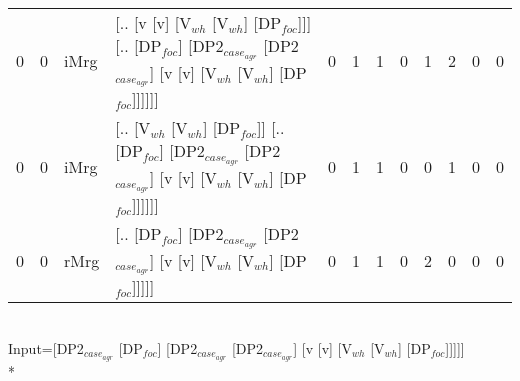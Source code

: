 \begin{tabularx}{\linewidth}{rrlXrrrrrrrr}
   0 &   0 & iMrg & [.. [v [v] [V$_{wh}$ [V$_{wh}$] [DP$_{foc}$]]] [.. [DP$_{foc}$] [DP2$_{case_{agr}}$ [DP2$_{case_{agr}}$] [v [v] [V$_{wh}$ [V$_{wh}$] [DP$_{foc}$]]]]]]                               &            0 &             1 &             1 &                  0 &            1 &             2 &                0 &            0 \\
   0 &   0 & iMrg & [.. [V$_{wh}$ [V$_{wh}$] [DP$_{foc}$]] [.. [DP$_{foc}$] [DP2$_{case_{agr}}$ [DP2$_{case_{agr}}$] [v [v] [V$_{wh}$ [V$_{wh}$] [DP$_{foc}$]]]]]]                                       &            0 &             1 &             1 &                  0 &            0 &             1 &                0 &            0 \\
   0 &   0 & rMrg & [.. [DP$_{foc}$] [DP2$_{case_{agr}}$ [DP2$_{case_{agr}}$] [v [v] [V$_{wh}$ [V$_{wh}$] [DP$_{foc}$]]]]]                                                                   &            0 &             1 &             1 &                  0 &            2 &             0 &                0 &            0 \\
\hline
\end{tabularx}\endgroup\\
\begingroup\scriptsize Input=[DP2$_{case_{agr}}$ [DP$_{foc}$] [DP2$_{case_{agr}}$ [DP2$_{case_{agr}}$] [v [v] [V$_{wh}$ [V$_{wh}$] [DP$_{foc}$]]]]]\\*
